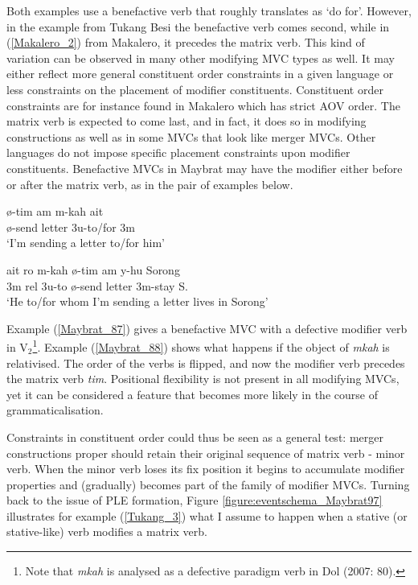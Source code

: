 Both examples use a benefactive verb that roughly translates as `do for'. However, in the example from Tukang Besi the benefactive verb comes second, while in (\ref{Makalero_2}) from Makalero, it precedes the matrix verb. This kind of variation can be observed in many other modifying MVC types as well. It may either reflect more general constituent order constraints in a given language or less constraints on the placement of modifier constituents. Constituent order constraints are for instance found in Makalero which has strict AOV order. The matrix verb is expected to come last, and in fact, it does so in modifying constructions as well as in some  MVCs that look like merger MVCs. Other languages do not impose specific placement constraints upon modifier constituents. Benefactive MVCs in Maybrat may have the modifier either before or after the matrix verb, as in the pair of examples below.

\pex
\a \label{Maybrat_87}
 
\gll ø-tim am m-kah ait \\
ø-send letter 3\acs{u}-to/for 3\acs{m} \\
\glft `I'm sending a letter to/for him'\\
\z
\a \label{Maybrat_88}
 
\gll ait ro m-kah  ø-tim am y-hu Sorong\\
3\acs{m} \acs{rel} 3\acs{u}-to ø-send letter 3\acs{m}-stay S. \\
\glft `He to/for whom I'm sending a letter lives in Sorong' \ 
\z
\xe

Example (\ref{Maybrat_87}) gives a benefactive MVC with a defective modifier verb in V$_2$\footnote{Note that \textit{mkah} is analysed as a defective paradigm verb in Dol (2007: 80).}. Example (\ref{Maybrat_88}) shows what happens if the object of \textit{mkah} is relativised. The order of the verbs is flipped, and now the modifier verb precedes the matrix verb \textit{tim}. Positional flexibility is not present in all modifying MVCs, yet it can be considered a feature that becomes more likely in the course of grammaticalisation.

Constraints in constituent order could thus be seen as a general test: merger constructions proper should retain their original sequence of matrix verb - minor verb. When the minor verb loses its fix position it begins to accumulate modifier properties and (gradually) becomes part of the family of modifier MVCs. Turning back to the issue of PLE formation, Figure \ref{figure:eventschema_Maybrat97} illustrates for example (\ref{Tukang_3}) what I assume to happen when a stative (or stative-like) verb modifies a matrix verb.

